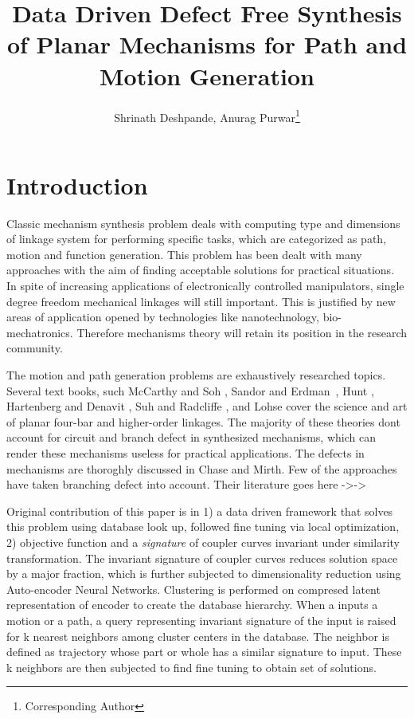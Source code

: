 \documentclass[twocolumn,10pt]{asme2ej}
\title{Data Driven Defect Free Synthesis of Planar Mechanisms for Path and Motion Generation}
\author{Shrinath Deshpande, Anurag Purwar\footnote{Corresponding Author}\\
    \affiliation{
    Computer-Aided Design and Innovation Lab \\
    Department of Mechanical Engineering\\
    Stony Brook University\\
    Stony Brook, New York, 11794-2300
    }
   }
\begin{document}
\maketitle

\begin{abstract}
\end{abstract}

\section{Introduction}
Classic mechanism synthesis problem deals with computing type and dimensions of linkage system for performing specific tasks, which are categorized as path, motion and function generation.
This problem has been dealt with many approaches with the aim of finding acceptable solutions for practical situations.
In spite of increasing applications of electronically controlled manipulators, single degree freedom mechanical linkages will still important.
This is justified by new areas of application opened by technologies like nanotechnology, bio-mechatronics.
Therefore mechanisms theory will retain its position in the research community.

The motion and path generation problems are exhaustively researched topics.
Several text books, such McCarthy and Soh \cite{sohmccarthy}, Sandor and Erdman~\cite{Sandor}, Hunt \cite{Hunt78}, Hartenberg and Denavit \cite{Hartenberg},  Suh and Radcliffe \cite{Suh78}, and Lohse \cite{lohse2013} cover the science and art of planar four-bar and higher-order linkages.
The majority of these theories dont account for circuit and branch defect in synthesized mechanisms, which can render these mechanisms useless for practical applications.
The defects in mechanisms are thoroghly discussed in Chase and Mirth\cite{chase}.
Few of the approaches have taken branching defect into account. Their literature goes here ->->

Original contribution of this paper is in 1) a data driven framework that solves this problem using database look up, followed fine tuning via local optimization,
2) objective function and a \emph{signature} of coupler curves invariant under similarity transformation.
The invariant signature of coupler curves reduces solution space by a major fraction, which is further subjected to dimensionality reduction using Auto-encoder Neural Networks.
Clustering is performed on compresed latent representation of encoder to create the database hierarchy.
When a inputs a motion or a path, a query representing invariant signature of the input is raised for k nearest neighbors among cluster centers in the database.
The neighbor is defined as trajectory whose part or whole has a similar signature to input. These k neighbors are then subjected to find fine tuning to obtain set of solutions.
\end{document}
